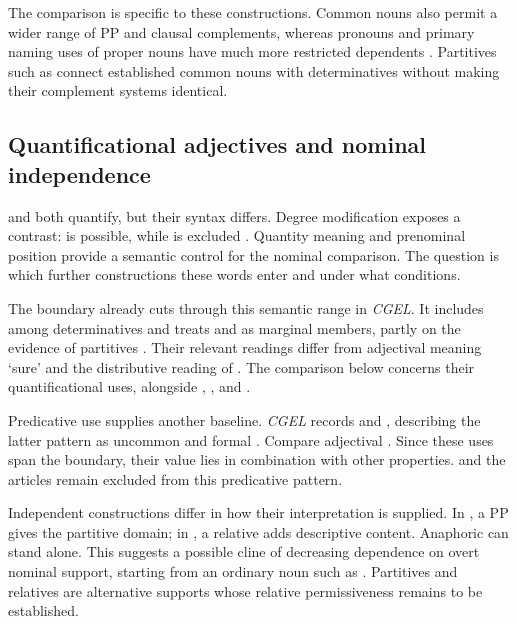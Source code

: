 \documentclass[12pt]{article}
\begin{document}
The comparison is specific to these constructions. Common nouns also permit a wider range of PP and clausal complements, whereas pronouns and primary naming uses of proper nouns have much more restricted dependents \citep[429--430, 439--443, 517--521]{huddleston2002}. Partitives such as  connect established common nouns with determinatives without making their complement systems identical.

\subsection{Quantificational adjectives and nominal independence}\label{sec:quant-controls}

 and  both quantify, but their syntax differs. Degree modification exposes a contrast:  is possible, while  is excluded \citep[539--540]{huddleston2002}. Quantity meaning and prenominal position provide a semantic control for the nominal comparison. The question is which further constructions these words enter and under what conditions.

The boundary already cuts through this semantic range in \textit{CGEL}. It includes  among determinatives and treats  and  as marginal members, partly on the evidence of partitives \citep[392--393]{huddleston2002}. Their relevant readings differ from adjectival  meaning ‘sure’ and the distributive reading of . The comparison below concerns their quantificational uses, alongside , , and .

Predicative use supplies another baseline. \textit{CGEL} records  and , describing the latter pattern as uncommon and formal \citep[392, 395--396]{huddleston2002}. Compare adjectival . Since these uses span the boundary, their value lies in combination with other properties.  and the articles remain excluded from this predicative pattern.

Independent constructions differ in how their interpretation is supplied. In , a PP gives the partitive domain; in , a relative adds descriptive content. Anaphoric  can stand alone. This suggests a possible cline of decreasing dependence on overt nominal support, starting from an ordinary noun such as . Partitives and relatives are alternative supports whose relative permissiveness remains to be established.
\end{document}
